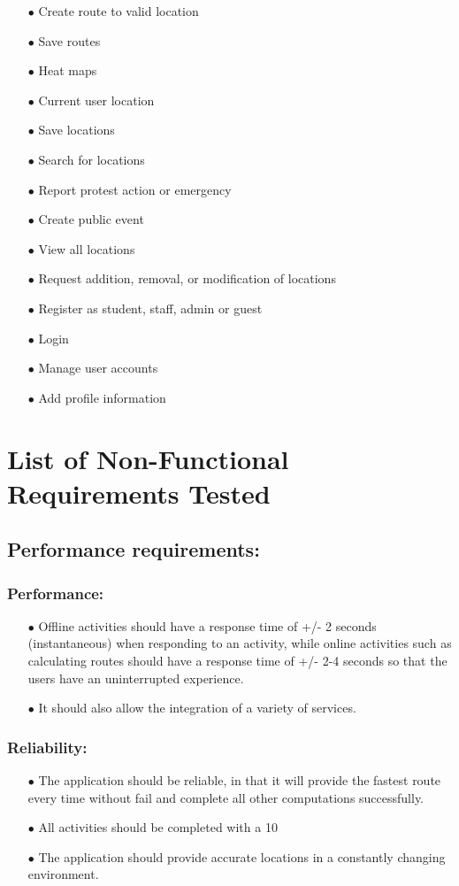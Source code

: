 \documentclass[english]{article}
\begin{document}
	\begin{itemize}
		\item[$\bullet$] Create route to valid location
		\item[$\bullet$] Save routes
		\item[$\bullet$] Heat maps
		\item[$\bullet$] Current user location
		\item[$\bullet$] Save locations
		\item[$\bullet$] Search for locations
		\item[$\bullet$] Report protest action or emergency
		\item[$\bullet$] Create public event
		\item[$\bullet$] View all locations
		\item[$\bullet$] Request addition, removal, or modification of locations
		\item[$\bullet$] Register as student, staff, admin or guest
		\item[$\bullet$] Login
		\item[$\bullet$] Manage user accounts
		\item[$\bullet$] Add profile information
	\end{itemize}
	
	\section{List of Non-Functional Requirements Tested}
	
	\subsection{Performance requirements:}
\subsubsection{Performance:}
	\begin{itemize}
		\item[$\bullet$] Offline activities should have a response time of +/- 2 seconds (instantaneous) when responding to an activity, while online activities such as calculating routes should have a response time of +/- 2-4 seconds so that the users have an uninterrupted experience.
		\item[$\bullet$] It should also allow the integration of a variety of services.
	\end{itemize}

\subsubsection{Reliability:}
\begin{itemize}
\item[$\bullet$]The application should be reliable, in that it will provide the fastest route every time without fail and complete all other computations successfully. 
\item[$\bullet$]All activities should be completed with a 10%
\item[$\bullet$]The application should provide accurate locations in a constantly changing environment.
\end{itemize}
\end{document}
